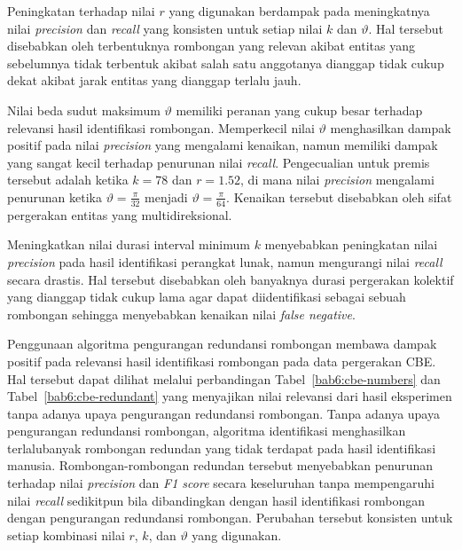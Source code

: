 Peningkatan terhadap nilai $r$ yang digunakan berdampak pada meningkatnya nilai \textit{precision} dan \textit{recall} yang konsisten untuk setiap nilai $k$ dan $\vartheta$. Hal tersebut disebabkan oleh terbentuknya rombongan yang relevan akibat entitas yang sebelumnya tidak terbentuk akibat salah satu anggotanya dianggap tidak cukup dekat akibat jarak entitas yang dianggap terlalu jauh.

Nilai beda sudut maksimum $\vartheta$ memiliki peranan yang cukup besar terhadap relevansi hasil identifikasi rombongan. Memperkecil nilai $\vartheta$ menghasilkan dampak positif pada nilai \textit{precision} yang mengalami kenaikan, namun memiliki dampak yang sangat kecil terhadap penurunan nilai \textit{recall}. Pengecualian untuk premis tersebut adalah ketika $k = 78$ dan $r = 1.52$, di mana nilai \textit{precision} mengalami penurunan ketika $\vartheta = \frac{\pi}{32}$ menjadi $\vartheta = \frac{\pi}{64}$. Kenaikan tersebut disebabkan oleh sifat pergerakan entitas yang multidireksional.

Meningkatkan nilai durasi interval minimum $k$ menyebabkan peningkatan nilai \textit{precision} pada hasil identifikasi perangkat lunak, namun mengurangi nilai \textit{recall} secara drastis. Hal tersebut disebabkan oleh banyaknya durasi pergerakan kolektif yang dianggap tidak cukup lama agar dapat diidentifikasi sebagai sebuah rombongan sehingga menyebabkan kenaikan nilai \textit{false negative}.

Penggunaan algoritma pengurangan redundansi rombongan membawa dampak positif pada relevansi hasil identifikasi rombongan pada data pergerakan CBE. Hal tersebut dapat dilihat melalui perbandingan Tabel~\ref{bab6:cbe-numbers} dan Tabel~\ref{bab6:cbe-redundant} yang menyajikan nilai relevansi dari hasil eksperimen tanpa adanya upaya pengurangan redundansi rombongan. Tanpa adanya upaya pengurangan redundansi rombongan, algoritma identifikasi menghasilkan terlalubanyak rombongan redundan yang tidak terdapat pada hasil identifikasi manusia. Rombongan-rombongan redundan tersebut menyebabkan penurunan terhadap nilai \textit{precision} dan \textit{F1 score} secara keseluruhan tanpa mempengaruhi nilai \textit{recall} sedikitpun bila dibandingkan dengan hasil identifikasi rombongan dengan pengurangan redundansi rombongan. Perubahan tersebut konsisten untuk setiap kombinasi nilai $r$, $k$, dan $\vartheta$ yang digunakan.

